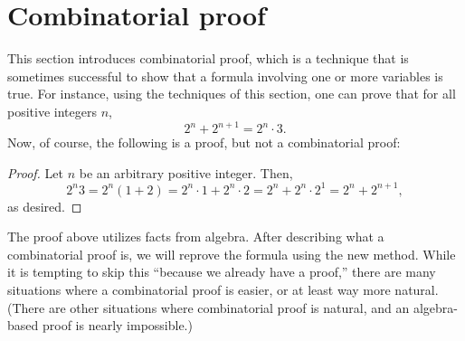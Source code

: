 \documentclass{book}
\theoremstyle{ekimcustom}
\begin{document}
\section{Combinatorial proof}

This section introduces combinatorial proof, which is a technique that is sometimes successful to show that a formula involving one or more variables is true. For instance, using the techniques of this section, one can prove that for all positive integers $n$,
\[ 2^n+2^{n+1} = 2^n \cdot 3.\]
Now, of course, the following is a proof, but not a combinatorial proof:
\begin{proof}
Let $n$ be an arbitrary positive integer. Then,
\[ 2^n 3 = 2^n(1+2) = 2^n \cdot 1 + 2^n \cdot 2 = 2^n + 2^n \cdot 2^1 = 2^n + 2^{n+1},\]
as desired.
\end{proof}
The proof above utilizes facts from algebra. After describing what a combinatorial proof is, we will reprove the formula using the new method. While it is tempting to skip this ``because we already have a proof,'' there are many situations where a combinatorial proof is easier, or at least way more natural. (There are other situations where combinatorial proof is natural, and an algebra-based proof is nearly impossible.)
\end{document}
